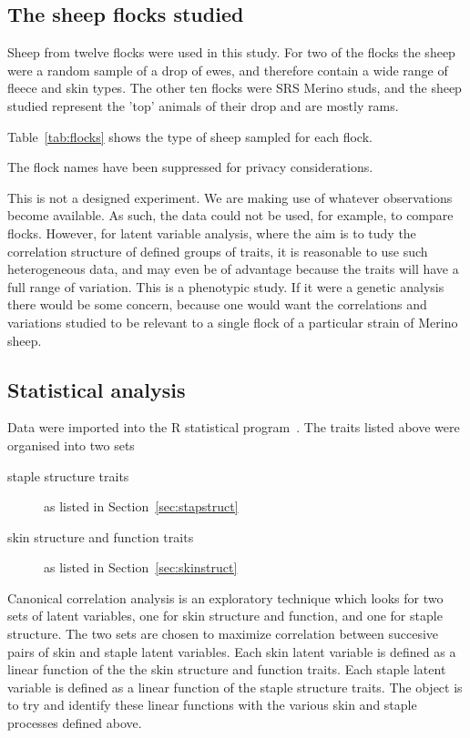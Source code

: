 \documentclass[titlepage]{article}  %
\begin{document}
\subsection{The sheep flocks studied}
Sheep from twelve flocks were used in this study. For two of the flocks the sheep were a random sample of a drop of ewes, and therefore contain a wide range of fleece and skin types. The other ten flocks were SRS Merino studs, and the sheep studied represent the 'top' animals of their drop and are mostly rams.

Table~\ref{tab:flocks} shows the type of sheep sampled for each flock.

The flock names have been suppressed for privacy considerations.
 
This is not a designed experiment. We are making use of whatever observations become available. As such, the data could not be used, for example, to compare flocks. However, for latent variable analysis, where the aim is to tudy the correlation structure of defined groups of traits, it is reasonable to use such heterogeneous data, and may even be of advantage because the traits will have a full range of variation. This is a phenotypic study. If it were a genetic analysis there would be some concern, because one would want the correlations and variations studied to be relevant to a single flock of a particular strain of Merino sheep.



\subsection{Statistical analysis}

 Data were imported into the R statistical program~\cite{rprog:13}. The traits listed above were organised into two sets
\begin{description}
\item[staple structure traits] as listed in Section~\ref{sec:stapstruct}
\item[skin structure and function traits] as listed in Section~\ref{sec:skinstruct}
\end{description}

Canonical correlation analysis is an exploratory technique which looks for two sets of latent variables, one for skin structure and function, and one for staple structure. The two sets are chosen to maximize correlation between succesive pairs of skin and staple latent variables. Each skin latent variable is defined as a linear function of the the skin structure and function traits. Each staple latent variable is defined as a linear function of the staple structure traits. The object is to try and identify these linear functions with the various skin and staple processes defined above.
 
\end{document}
